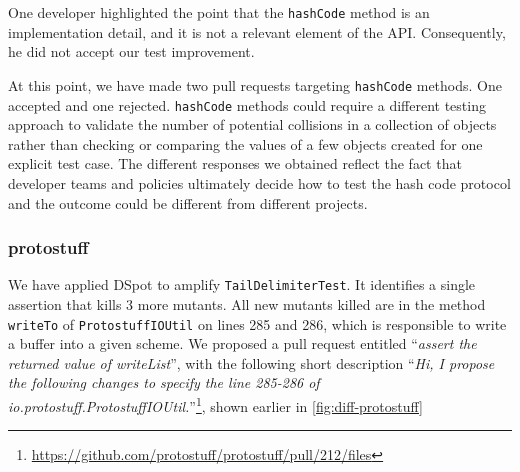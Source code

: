 \documentclass[table,xcdraw,smallextended]{svjour3}
\newcommand{\TODO}[1]{\textcolor{red}{#1}\GenericWarning{}{LaTeX Warning: TODO: #1}}\newcommand\todo\TODO
\newcommand{\dspot}{DSpot\xspace}
\begin{document}
One developer highlighted the point that the \texttt{hashCode} method is an implementation detail, and it is not a relevant element of the API. Consequently, he did not accept our test improvement.

At this point, we have made two pull requests targeting \texttt{hashCode} methods. One accepted and one rejected. \texttt{hashCode} methods could require a different testing approach to validate the number of potential collisions in a collection of objects rather than checking or comparing the values of a few objects created for one explicit test case. The different responses we obtained reflect the fact that developer teams and policies ultimately decide how to test the hash code protocol and the outcome could be different from different projects.



\subsubsection{protostuff}

We have applied \dspot to amplify \texttt{TailDelimiterTest}. It identifies a single assertion that kills 3 more mutants.
All new mutants killed are in the method \texttt{writeTo} of \texttt{ProtostuffIOUtil} on lines 285 and 286, which is responsible to write a buffer into a given scheme. We proposed a pull request entitled ``\emph{assert the returned value of writeList}'', with the following short description ``\emph{Hi, I propose the following changes to specify the line 285-286 of io.protostuff.ProtostuffIOUtil.}''\footnote{\url{https://github.com/protostuff/protostuff/pull/212/files}}, shown earlier in \autoref{fig:diff-protostuff}
\end{document}
